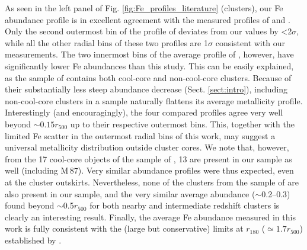 \documentclass{aa}
\begin{document}
As seen in the left panel of Fig. \ref{fig:Fe_profiles_literature} (clusters), our Fe abundance profile is in excellent agreement with the measured profiles of \citet{2009MNRAS.395..764S} and \citet{2011A&A...527A.134M}. Only the second outermost bin of the profile of \citet{2011A&A...527A.134M} deviates from our values by <2$\sigma$, while all the other radial bins of these two profiles are 1$\sigma$ consistent with our measurements. The two innermost bins of the average profile of \citet{2008A&A...487..461L}, however, have significantly lower Fe abundances than this study. This can be easily explained, as the sample of \citet{2008A&A...487..461L} contains both cool-core and non-cool-core clusters. Because of their substantially less steep abundance decrease (Sect. \ref{sect:intro}), including non-cool-core clusters in a sample naturally flattens its average metallicity profile. Interestingly (and encouragingly), the four compared profiles agree very well beyond $\sim$$0.15r_{500}$ up to their respective outermost bins. This, together with the limited Fe scatter in the outermost radial bins of this work, may suggest a universal metallicity distribution outside cluster cores. We note that, however, from the 17 cool-core objects of the sample of \citet{2011A&A...527A.134M}, 13 are present in our sample as well (including M\,87). Very similar abundance profiles were thus expected, even at the cluster outskirts. Nevertheless, none of the clusters from the sample of \citet{2008A&A...487..461L} are also present in our sample, and the very similar average abundance ($\sim$0.2--0.3) found beyond $\sim$0.5$r_{500}$ for both nearby and intermediate redshift clusters is clearly an interesting result. Finally, the average Fe abundance measured in this work is fully consistent with the (large but conservative) limits at $r_{180}$ ($\simeq 1.7 r_{500}$) established by \citet{2016A&A...586A..32M}.
\end{document}
